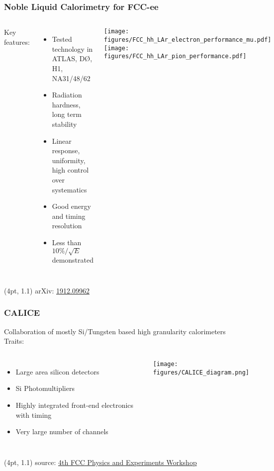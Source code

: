 \documentclass[aspectratio=169]{beamer}
\newcommand{\bluetext}[1]{%
  \textcolor{myBlue}{#1}
}
\begin{document}
\begin{frame}
  \frametitle{Noble Liquid Calorimetry for FCC-ee}

  \begin{columns}[c]
    \bluetext{Key features:}
    \begin{itemize}
      \item Tested technology in ATLAS, D\O, H1, NA31/48/62
      \item Radiation hardness, long term stability
      \item Linear response, uniformity, high control over systematics
      \item Good energy and timing resolution
      \item Less than $10\%/\sqrt{E}$ demonstrated
    \end{itemize}

    \begin{center}
      \texttt{[image: figures/FCC\_hh\_LAr\_electron\_performance\_mu.pdf]}
      \texttt{[image: figures/FCC\_hh\_LAr\_pion\_performance.pdf]}
    \end{center}
  \end{columns}

  \begin{textblock*}{\paperwidth}(4pt, 1.1\textheight)
    \tiny arXiv:
    \href{https://arxiv.org/abs/1912.09962}
         {1912.09962}
  \end{textblock*}
\end{frame}


\begin{frame}
  \frametitle{CALICE}

  Collaboration of mostly Si/Tungsten based high granularity calorimeters\\[1ex]
  \bluetext{Traits:}
  \begin{columns}[c]
    \begin{itemize}
      \item Large area silicon detectors
      \item Si Photomultipliers
      \item Highly integrated front-end electronics with timing
      \item Very large number of channels
    \end{itemize}

    \texttt{[image: figures/CALICE\_diagram.png]}
  \end{columns}

  \begin{textblock*}{\paperwidth}(4pt, 1.1\textheight)
    \tiny source:
    \href{https://indico.cern.ch/event/932973/}
         {4th FCC Physics and Experiments Workshop}
  \end{textblock*}
\end{frame}
\end{document}
